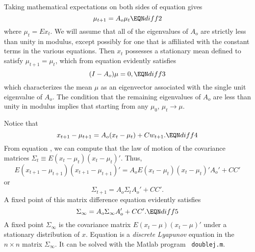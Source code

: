 Taking mathematical expectations on both sides of equation
 gives
$$ \mu_{t+1} = A_o \mu_t \EQN diff2 $$
where $\mu_t = E x_t $.   We will assume that all of the eigenvalues
of $A_o$ are strictly  less than unity in modulus, except possibly for one that
is affiliated with the constant terms in the various equations.  Then
$x_t$  possesses a stationary mean defined to satisfy
$\mu_{t+1} = \mu_t$, which from equation  evidently satisfies
$$ (I - A_o) \mu = 0 , \EQN diff3  $$
which characterizes the mean $\mu$ as an eigenvector
associated with the single unit eigenvalue of $A_o$. The condition
 that the remaining eigenvalues of $A_o$ are less than unity
in modulus implies that starting from any $\mu_0$, $\mu_t
\rightarrow \mu$.

Notice that
$$ x_{t+1} - \mu_{t+1} = A_o ( x_t - \mu_t) + C w_{t+1}. \EQN diff4 $$
  From equation ,
we can compute that the law of motion of the  covariance matrices
$ \Sigma_t \equiv E(x_t - \mu_t) (x_t - \mu_t)' .$
Thus,
$$ E(x_{t+1} - \mu_{t+1}) (x_{t+1} -\mu_{t+1})' = A_o E(x_t -\mu_t) (x_t-\mu_t)'A_o'
  + C C'$$
or
$$ \Sigma_{t+1} = A_o \Sigma_t A_o' + C C' . $$
A fixed point of this matrix difference equation evidently  satisfies
$$ \Sigma_\infty = A_o \Sigma_\infty A_o' + C C' .  \EQN diff5 $$
A fixed point $ \Sigma_\infty  $
 is the covariance matrix $E (x_t -\mu) (x_t - \mu)'$ under  a stationary distribution of $x$.
%
Equation  is
a {\it discrete Lyapunov} equation in the $n \times n$ matrix
$\Sigma_\infty$.  It can be solved with the Matlab program {\tt
doublej.m}. %
%


